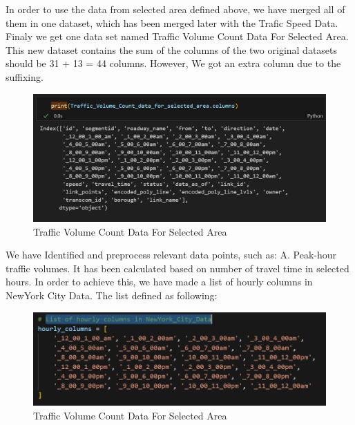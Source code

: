 \newline
\newline
In order to use the data from selected area defined above, we have merged all of them in one dataset, which has been merged later with the Trafic Speed Data. Finaly we get one data set named Traffic Volume Count Data For Selected Area. This new dataset contains the sum of the columns of the two original datasets should be 31 + 13 = 44 columns. However, We got an extra column due to the suffixing. 
\newline
\newline
\begin{figure}[h]
    \centering
    \includegraphics[width=1\linewidth]{figures/mereged_dataset.PNG}
    \caption{Traffic Volume Count Data For Selected Area}
    \label{fig:Traffic Volume Count Data For Selected Area}
\end{figure}
\newline
\newline
We have Identified and preprocess relevant data points, such as:
\newline A. Peak-hour traffic volumes. It has been calculated based on number of travel time in selected hours. In order to achieve this, we have made a list of hourly columns in NewYork City Data. The list defined as following:
\newline
\newline
\begin{figure}[h]
    \centering
    \includegraphics[width=1\linewidth]{figures/List_of_hourly_columns.PNG}
    \caption{Traffic Volume Count Data For Selected Area}
    \label{fig: List Of Hourly Columns in New Yourk City}
\end{figure}
